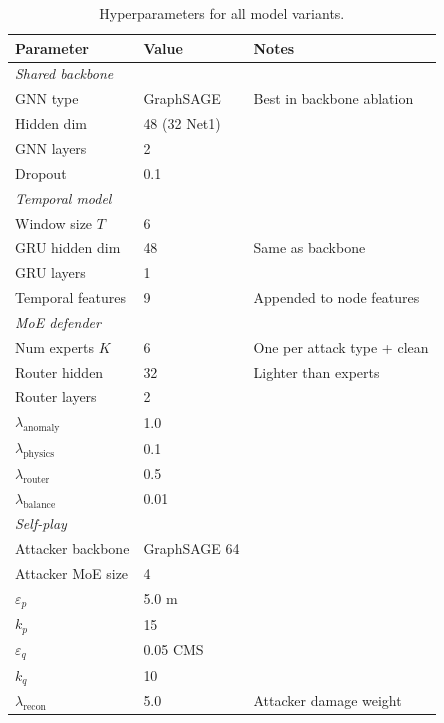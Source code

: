 \begin{table}[htbp]
  \centering
  \caption{Hyperparameters for all model variants.}
  \label{tab:app_hyperparams}
  \begin{tabular}{lll}
    \toprule
    Parameter & Value & Notes \\
    \midrule
    \multicolumn{3}{l}{\textit{Shared backbone}} \\
    GNN type          & GraphSAGE     & Best in backbone ablation \\
    Hidden dim        & 48 (32 Net1)  & \\
    GNN layers        & 2             & \\
    Dropout           & 0.1           & \\
    \midrule
    \multicolumn{3}{l}{\textit{Temporal model}} \\
    Window size $T$   & 6             & \\
    GRU hidden dim    & 48            & Same as backbone \\
    GRU layers        & 1             & \\
    Temporal features & 9             & Appended to node features \\
    \midrule
    \multicolumn{3}{l}{\textit{MoE defender}} \\
    Num experts $K$   & 6             & One per attack type + clean \\
    Router hidden     & 32            & Lighter than experts \\
    Router layers     & 2             & \\
    $\lambda_\text{anomaly}$ & 1.0  & \\
    $\lambda_\text{physics}$ & 0.1  & \\
    $\lambda_\text{router}$  & 0.5  & \\
    $\lambda_\text{balance}$ & 0.01 & \\
    \midrule
    \multicolumn{3}{l}{\textit{Self-play}} \\
    Attacker backbone & GraphSAGE 64  & \\
    Attacker MoE size & 4             & \\
    $\varepsilon_p$   & 5.0 m         & \\
    $k_p$             & 15            & \\
    $\varepsilon_q$   & 0.05 CMS      & \\
    $k_q$             & 10            & \\
    $\lambda_\text{recon}$   & 5.0  & Attacker damage weight \\

\end{tabular}
\end{table}
